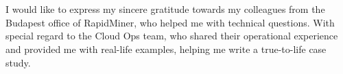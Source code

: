 \chapter*{\koszonetnyilvanitas}

I would like to express my sincere gratitude towards my colleagues from the Budapest office of RapidMiner, who helped me with technical questions. With special regard to the Cloud Ops team, who shared their operational experience and provided me with real-life examples, helping me write a true-to-life case study.
